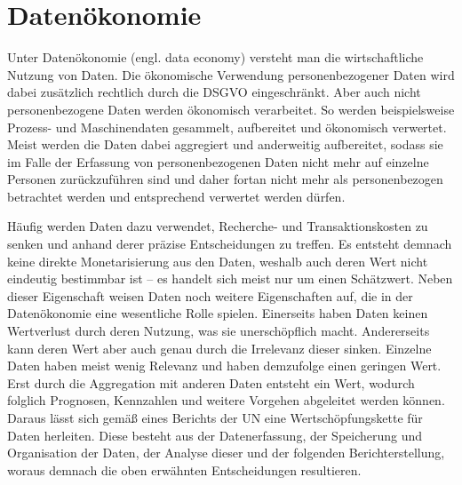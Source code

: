 \section{Datenökonomie} \label{datenoekonomie}
Unter Datenökonomie (engl. data economy) versteht man die wirtschaftliche Nutzung von Daten. Die ökonomische Verwendung personenbezogener Daten wird dabei zusätzlich rechtlich durch die DSGVO eingeschränkt. Aber auch nicht personenbezogene Daten werden ökonomisch verarbeitet. So werden beispielsweise Prozess- und Maschinendaten gesammelt, aufbereitet und ökonomisch verwertet. \cite{bpb_2019} Meist werden die Daten dabei aggregiert und anderweitig aufbereitet, sodass sie im Falle der Erfassung von personenbezogenen Daten nicht mehr auf einzelne Personen zurückzuführen sind und daher fortan nicht mehr als personenbezogen betrachtet werden und entsprechend verwertet werden dürfen. \newline

\noindent Häufig werden Daten dazu verwendet, Recherche- und Transaktionskosten zu senken und anhand derer präzise Entscheidungen zu treffen. Es entsteht demnach keine direkte Monetarisierung aus den Daten, weshalb auch deren Wert nicht eindeutig bestimmbar ist -- es handelt sich meist nur um einen Schätzwert. Neben dieser Eigenschaft weisen Daten noch weitere Eigenschaften auf, die in der Datenökonomie eine wesentliche Rolle spielen. Einerseits haben Daten keinen Wertverlust durch deren Nutzung, was sie unerschöpflich macht. Andererseits kann deren Wert aber auch genau durch die Irrelevanz dieser sinken. Einzelne Daten haben meist wenig Relevanz und haben demzufolge einen geringen Wert. Erst durch die Aggregation mit anderen Daten entsteht ein Wert, wodurch folglich Prognosen, Kennzahlen und weitere Vorgehen abgeleitet werden können. Daraus lässt sich gemäß eines Berichts der \gls{UN} eine Wertschöpfungskette für Daten herleiten. Diese besteht aus der Datenerfassung, der Speicherung und Organisation der Daten, der Analyse dieser und der folgenden Berichterstellung, woraus demnach die oben erwähnten Entscheidungen resultieren. \cite{un_2019} \newline

